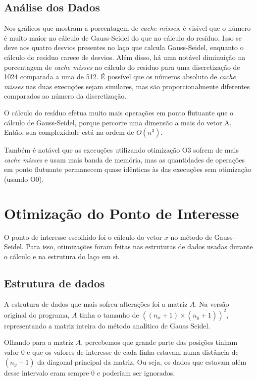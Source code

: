 \documentclass[12pt]{article}
\begin{document}
	\subsection{Análise dos Dados}
	
	Nos gráficos que mostram a porcentagem de \emph{cache misses}, é visível que o número é muito maior no cálculo de Gauss-Seidel do que no cálculo do resíduo.
	Isso se deve aos quatro desvios presentes no laço que calcula Gauss-Seidel, enquanto o cálculo do resíduo carece de desvios.
	Além disso, há uma notável diminuição na porcentagem de \emph{cache misses} no cálculo do resíduo para uma discretização de 1024 comparada a uma de 512.
	É possível que os números absoluto de \emph{cache misses} nas duas execuções sejam similares, mas são proporcionalmente diferentes comparados ao número da discretização.
	
	O cálculo do resíduo efetua muito mais operações em ponto flutuante que o cálculo de Gauss-Seidel, porque percorre uma dimensão a mais do vetor A.
	Então, sua complexidade está na ordem de $O(n^3)$.
	
	Também é notável que as execuções utilizando otimização O3 sofrem de mais \emph{cache misses} e usam mais banda de memória, mas as quantidades de operações em ponto flutuante permanecem quase idênticas às das execuções sem otimização (usando O0). 
	
\newpage

\section{Otimização do Ponto de Interesse}

O ponto de interesse escolhido foi o cálculo do vetor $x$ no método de Gauss-Seidel.
Para isso, otimizações foram feitas nas estruturas de dados usadas durante o cálculo e na estrutura do laço em si.

	\subsection{Estrutura de dados}
	A estrutura de dados que mais sofreu alterações foi a matriz $A$.
	Na versão original do programa, $A$ tinha o tamanho de $((n_x+1)\times(n_y+1))^2$, representando a matriz inteira do método analítico de Gauss Seidel.
	
	Olhando para a matriz $A$, percebemos que grande parte das posições tinham valor $0$ e que os valores de interesse de cada linha estavam numa distância de $(n_y+1)$ da diagonal principal da matriz.
	Ou seja, os dados que estavam além desse intervalo eram sempre $0$ e poderiam ser ignorados.
	
\end{document}
